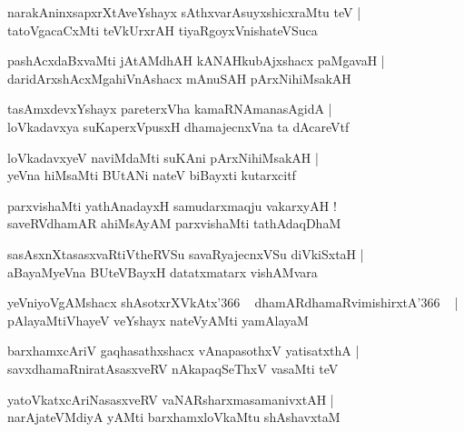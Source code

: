 \documentclass[twoside,12pt,openright]{book}
\newcounter{shloka}[chapter]
\begin{document}
\begin{shloka}
narakAninxsapxrXtAveYshayx sAthxvarAsuyxshicxraMtu teV |\\
tatoVgacaCxMti teVkUrxrAH tiyaRgoyxVnishateVSuca
\end{shloka}

\begin{shloka}
pashAcxdaBxvaMti jAtAMdhAH kANAHkubAjxshacx paMgavaH |\\
daridArxshAcxMgahiVnAshacx mAnuSAH pArxNihiMsakAH 
\end{shloka}

\begin{shloka}
tasAmxdevxYshayx pareterxVha kamaRNAmanasAgidA |\\
loVkadavxya suKaperxVpusxH dhamajecnxVna ta dAcareVtf 
\end{shloka}

\begin{shloka}
loVkadavxyeV naviMdaMti suKAni pArxNihiMsakAH |\\
yeVna hiMsaMti BUtANi nateV biBayxti kutarxcitf 
\end{shloka}

\begin{shloka}
parxvishaMti yathAnadayxH samudarxmaqju vakarxyAH !\\
saveRVdhamAR ahiMsAyAM parxvishaMti tathAdaqDhaM 
\end{shloka}

\begin{shloka}
sasAsxnXtasasxvaRtiVtheRVSu savaRyajecnxVSu diVkiSxtaH |\\
aBayaMyeVna BUteVBayxH datatxmatarx vishAMvara 
\end{shloka}

\begin{shloka}
yeVniyoVgAMshacx shAsotxrXVkAtx\char'366 ~ dhamARdhamaRvimishirxtA\char'366 ~ |\\
pAlayaMtiVhayeV veYshayx nateVyAMti yamAlayaM 
\end{shloka}

\begin{shloka}
barxhamxcAriV gaqhasathxshacx vAnapasothxV yatisatxthA |\\
savxdhamaRniratAsasxveRV nAkapaqSeThxV vasaMti teV 
\end{shloka}

\begin{shloka}
yatoVkatxcAriNasasxveRV vaNARsharxmasamanivxtAH |\\
narAjateVMdiyA yAMti barxhamxloVkaMtu shAshavxtaM 
\end{shloka}
\end{document}
